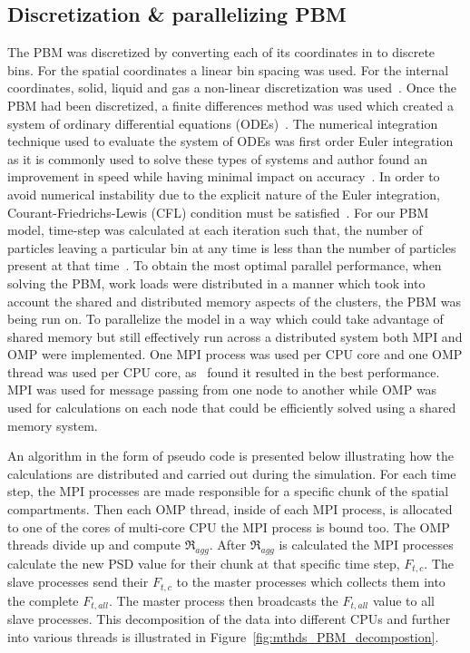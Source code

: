 \documentclass[preprint,11pt,authoryear]{elsarticle}
\begin{document}
\subsection{Discretization \& parallelizing PBM}
The PBM was discretized by converting each of its coordinates in to discrete bins. For the spatial 
coordinates a linear bin spacing was used. For the internal coordinates, solid, liquid and gas a 
non-linear discretization was used~\citep{barrasso2012}. 
Once the PBM had been discretized, a finite differences method was 
used which created a system of ordinary differential equations (ODEs)~\citep{Barrasso2015cerd}. The 
numerical integration technique used to evaluate the system of ODEs was first order Euler integration 
as it is commonly used to solve these types of systems and author found an improvement in  speed while
having minimal impact on accuracy~\citep{Barrasso2013}. In order to avoid numerical instability due 
to the explicit nature of the Euler integration, Courant-Friedrichs-Lewis (CFL) condition must be 
satisfied~\citep{courant1967}. For our PBM model, time-step was calculated at each iteration such 
that, the number of particles leaving a particular bin at any time is less than the number of 
particles present at that time~\citep{Ramachandran2010}. To obtain the most optimal parallel 
performance, when solving the PBM, work loads were distributed in a manner which took into account 
the shared and distributed memory aspects of the clusters, the PBM was being run on. To 
parallelize the model in a way which could take advantage of shared memory but still effectively run 
across a distributed system both MPI and OMP were implemented. One MPI process was used per CPU core and one OMP 
thread was used per CPU core, as~\cite{Bettencourt2017} found it resulted in the best performance. 
MPI was used for message passing from one node to another while OMP was used for calculations on each 
node that could be efficiently solved using a shared memory system. 

An algorithm in the form of pseudo code is presented below illustrating how the calculations are distributed and 
carried out 
during the simulation. For each time step, the MPI processes are made responsible for a specific chunk 
of the spatial compartments. Then each OMP thread, inside of each MPI process, is allocated to one of 
the cores of multi-core CPU the MPI process is bound too. The OMP threads divide up and 
compute $\Re_{agg}$. After $\Re_{agg}$ is calculated the MPI 
processes calculate the new PSD value for their chunk at that specific time step, $F_{t,c}$. The slave 
processes send their $F_{t,c}$ to the master processes which collects them into the complete 
$F_{t,all}$. The master process then broadcasts the $F_{t,all}$ value to all slave processes. This 
decomposition of the data into different CPUs and further into various threads is illustrated in Figure~\ref{fig:mthds_PBM_decompostion}.	
\end{document}
